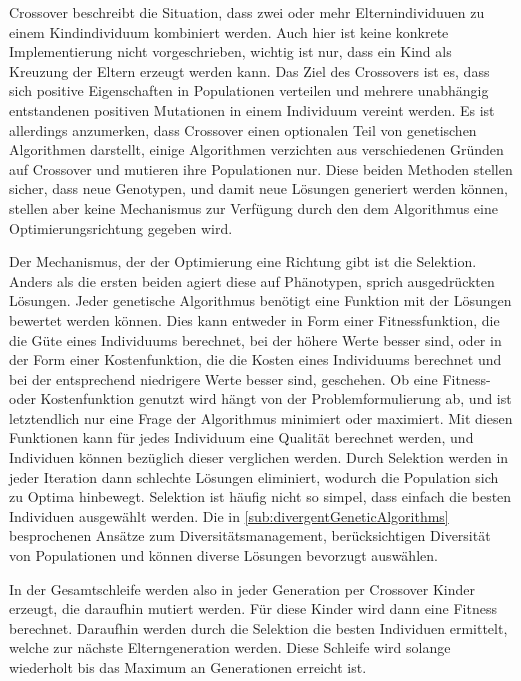 Crossover beschreibt die Situation, dass zwei oder mehr Elternindividuuen zu einem Kindindividuum kombiniert werden. 
Auch hier ist keine konkrete Implementierung nicht vorgeschrieben, wichtig ist nur, dass ein Kind als Kreuzung der Eltern erzeugt werden kann.
Das Ziel des Crossovers ist es, dass sich positive Eigenschaften in Populationen verteilen und mehrere unabhängig entstandenen positiven Mutationen in einem Individuum vereint werden.
Es ist allerdings anzumerken, dass Crossover einen optionalen Teil von genetischen Algorithmen darstellt, einige Algorithmen%
verzichten aus verschiedenen Gründen auf Crossover und mutieren ihre Populationen nur.
Diese beiden Methoden stellen sicher, dass neue Genotypen, und damit neue Lösungen generiert werden können, stellen aber keine Mechanismus zur Verfügung durch den dem Algorithmus eine Optimierungsrichtung gegeben wird.

Der Mechanismus, der der Optimierung eine Richtung gibt ist die Selektion.
Anders als die ersten beiden agiert diese auf Phänotypen, sprich ausgedrückten Lösungen.
Jeder genetische Algorithmus benötigt eine Funktion mit der Lösungen bewertet werden können.
Dies kann entweder in Form einer Fitnessfunktion, die die Güte eines Individuums berechnet, bei der höhere Werte besser sind, oder in der Form einer Kostenfunktion, die die Kosten eines Individuums berechnet und bei der entsprechend niedrigere Werte besser sind, geschehen.
Ob eine Fitness- oder Kostenfunktion genutzt wird hängt von der Problemformulierung ab, und ist letztendlich nur eine Frage der Algorithmus minimiert oder maximiert.
Mit diesen Funktionen kann für jedes Individuum eine Qualität berechnet werden, und Individuen können bezüglich dieser verglichen werden.
Durch Selektion werden in jeder Iteration dann schlechte Lösungen eliminiert, wodurch die Population sich zu Optima hinbewegt.
Selektion ist häufig nicht so simpel, dass einfach die besten Individuen ausgewählt werden.
Die in \cref{sub:divergentGeneticAlgorithms} besprochenen Ansätze zum Diversitätsmanagement, berücksichtigen Diversität von Populationen und können diverse Lösungen bevorzugt auswählen.

In der Gesamtschleife werden also in jeder Generation per Crossover Kinder erzeugt, die daraufhin mutiert werden.
Für diese Kinder wird dann eine Fitness berechnet.
Daraufhin werden durch die Selektion die besten Individuen ermittelt, welche zur nächste Elterngeneration werden.
Diese Schleife wird solange wiederholt bis das Maximum an Generationen erreicht ist.

